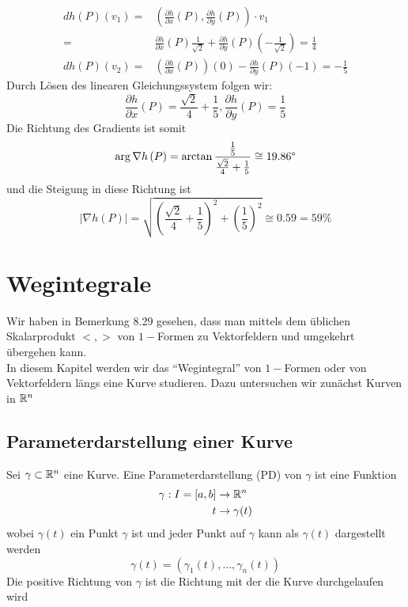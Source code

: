 \begin{enumerate}
\begin{align*}
dh \left( P\right) \left( v_1\right) = &\left( \frac{\partial h}{\partial x}\left(P\right), \frac{\partial h}{\partial y}\left(P\right)\right)\cdot v_1\\
= & \frac{\partial h}{\partial x}\left(P\right)\frac{1}{\sqrt{2}} +\frac{\partial h}{\partial y}\left( P\right) \left(-\frac{1}{\sqrt{2}}\right) = \frac{1}{4}\\
dh \left( P\right) \left( v_2\right) = &\left( \frac{\partial h}{\partial x}\left(P\right)\right) (0) - \frac{\partial h}{\partial y}\left(P\right)(-1)=-\frac{1}{5}
\end{align*}
Durch Lösen des linearen Gleichungssystem folgen wir:
\[\frac{\partial h}{\partial x}\left( P\right) = \frac{\sqrt{2}}{4}+\frac{1}{5}, \frac{\partial h}{\partial y}\left( P\right) = \frac{1}{5}\]
Die Richtung des Gradients ist somit \[ \arg\nabla h\left( P \right) = \arctan{\frac{\frac{1}{5}}{\frac{\sqrt{2}}{4}+ \frac{1}{5}}}\cong 19.86\text{\textdegree} \]
und die Steigung in diese Richtung ist
\[\left| \nabla h\left( P\right) \right| = \sqrt{\left( \frac{\sqrt{2}}{4}+\frac{1}{5}\right)^2 + \left( \frac{1}{5}\right)^2} \cong 0.59 = 59\%\] 
\end{enumerate}

\section{Wegintegrale}
Wir haben in Bemerkung 8.29 gesehen, dass man mittels dem üblichen Skalarprodukt $<,>$ von $1-$Formen zu Vektorfeldern und umgekehrt übergehen kann. \\

In diesem Kapitel werden wir das ``Wegintegral'' von $1-$Formen oder  von Vektorfeldern längs eine Kurve studieren. Dazu untersuchen wir zunächst Kurven in $\mathbb{R}^n$

\subsection*{Parameterdarstellung einer Kurve}
Sei $\gamma\subset\mathbb{R}^n$ eine Kurve. Eine Parameterdarstellung (PD) von $\gamma$ ist eine Funktion
\begin{align*}
\gamma : I=\lbrack a,b\rbrack &\to\mathbb{R}^n\\
t &\to \gamma (t)
\end{align*}
wobei $\gamma\left( t\right)$ ein Punkt $\gamma$ ist und jeder Punkt auf $\gamma$ kann als $\gamma\left( t\right)$ dargestellt werden
\[\gamma\left( t\right) = \left( \gamma_1 (t),\dots,\gamma_n (t)\right)\]
Die positive Richtung von $\gamma$ ist die Richtung mit der die Kurve durchgelaufen wird
